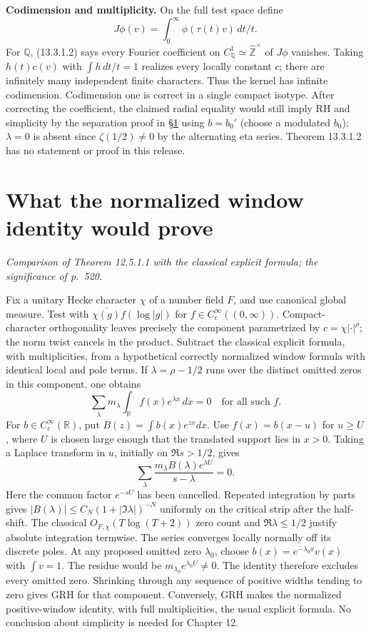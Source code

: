 \documentclass[11pt,reqno]{amsart}
\numberwithin{equation}{section}
\newcommand{\Q}{\mathbb Q}\newcommand{\R}{\mathbb R}\newcommand{\C}{\mathbb C}\newcommand{\Z}{\mathbb Z}
\begin{document}
\textbf{Codimension and multiplicity.} On the full test space define \[J\phi(v)=\int_0^\infty\phi(\tau(t)v)\,dt/t.\] For \(\Q\), (13.3.1.2) says every Fourier coefficient on \(C_\Q^1\simeq\widehat{\Z}^\times\) of \(J\phi\) vanishes. Taking \(h(t)c(v)\) with \(\int h\,dt/t=1\) realizes every locally constant \(c\); there are infinitely many independent finite characters. Thus the kernel has infinite codimension. Codimension one is correct in a single compact isotype. After correcting the coefficient, the claimed radial equality would still imply RH and simplicity by the separation proof in \S\ref{sec:12} using \(b=b_0'\) (choose a modulated \(b_0\)); \(\lambda=0\) is absent since \(\zeta(1/2)\ne0\) by the alternating eta series. Theorem 13.3.1.2 has no statement or proof in this release.


\section{What the normalized window identity would prove}\label{sec:12}

\textit{Comparison of Theorem 12.5.1.1 with the classical explicit formula; the significance of p.~520.}\par
Fix a unitary Hecke character \(\chi\) of a number field \(F\), and use canonical global measure. Test with \(\overline{\chi(g)}f(\log|g|)\) for \(f\in C_c^\infty((0,\infty))\). Compact-character orthogonality leaves precisely the component parametrized by \(c=\chi|\cdot|^\rho\); the norm twist cancels in the product. Subtract the classical explicit formula, with multiplicities, from a hypothetical correctly normalized window formula with identical local and pole terms. If \(\lambda=\rho-1/2\) runs over the distinct omitted zeros in this component, one obtains
\[
       \sum_{\lambda}m_\lambda\int_\R f(x)e^{\lambda x}\,dx=0
       \quad\text{for all such } f.
\]
For \(b\in C_c^\infty(\R)\), put \(B(z)=\int b(x)e^{zx}dx\). Use \(f(x)=b(x-u)\) for \(u\ge U\), where \(U\) is chosen large enough that the translated support lies in \(x>0\). Taking a Laplace transform in \(u\), initially on \(\Re s>1/2\), gives
\[
       \sum_\lambda\frac{m_\lambda B(\lambda)e^{\lambda U}}{s-\lambda}=0 .
\]
Here the common factor \(e^{-sU}\) has been cancelled. Repeated integration by parts gives \(|B(\lambda)|\le C_N(1+|\Im\lambda|)^{-N}\) uniformly on the critical strip after the half-shift. The classical \(O_{F,\chi}(T\log(T+2))\) zero count and \(\Re\lambda\le1/2\) justify absolute integration termwise. The series converges locally normally off its discrete poles. At any proposed omitted zero \(\lambda_0\), choose \(b(x)=e^{-\lambda_0x}v(x)\) with \(\int v=1\). The residue would be \(m_{\lambda_0}e^{\lambda_0U}\ne0\). The identity therefore excludes every omitted zero. Shrinking through any sequence of positive widths tending to zero gives GRH for that component. Conversely, GRH makes the normalized positive-window identity, with full multiplicities, the usual explicit formula. No conclusion about simplicity is needed for Chapter 12.
\end{document}
